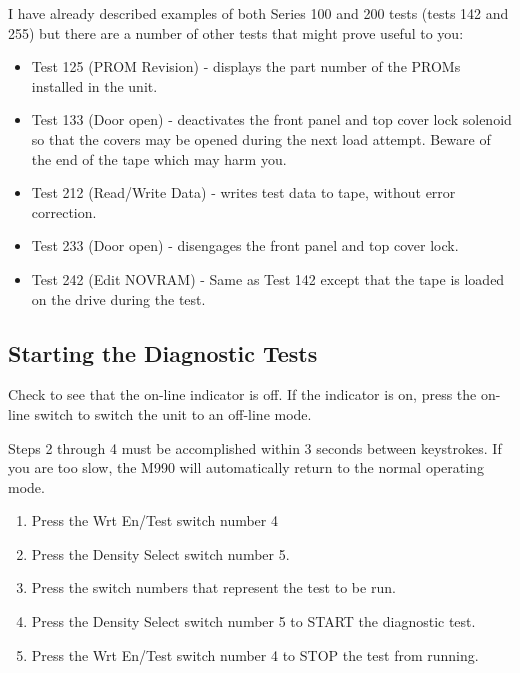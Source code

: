 I have already described examples of both Series 100 and 200 tests
(tests 142 and 255) but there are a number of other tests that might prove useful
to you:

\begin{itemize}

\item Test 125 (PROM Revision) - displays the part number of the PROMs
installed in the unit.

\item Test 133 (Door open) - deactivates the front panel and top cover lock
solenoid so that the covers may be opened during the next load attempt.
Beware of the end of the tape which may harm you.

\item Test 212 (Read/Write Data) - writes test data to tape, without error
correction.

\item Test 233 (Door open) - disengages the front panel and top cover lock.

\item Test 242 (Edit NOVRAM) - Same as Test 142 except that the tape is loaded
on the drive during the test.

\end{itemize}

\subsection{Starting the Diagnostic Tests}

Check to see that the on-line indicator is off. If the indicator is on, press
the on-line
switch to switch the unit to an off-line mode.

Steps 2 through 4 must be accomplished within 3 seconds between keystrokes. If
you are too slow, the M990 will automatically return to the normal
operating mode.

\begin{enumerate}

\item Press the Wrt En/Test switch number 4

\item Press the Density Select switch number 5.

\item Press the switch numbers that represent the test to be run.

\item Press the Density Select switch number 5 to START the diagnostic test.

\item Press the Wrt En/Test switch number 4 to STOP the test from running.

\end{enumerate}

